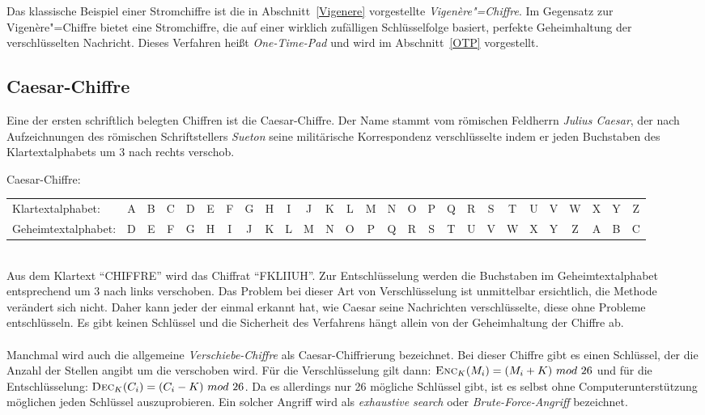 Das klassische Beispiel einer Stromchiffre ist die in Abschnitt~\ref{Vigenere} vorgestellte \emph{Vigen\`ere"=Chiffre}. Im Gegensatz zur Vigen\`ere"=Chiffre
bietet eine Stromchiffre, die auf einer wirklich zufälligen Schlüsselfolge basiert, perfekte Geheimhaltung der verschlüsselten Nachricht. Dieses Verfahren heißt \emph{One-Time-Pad} und wird im Abschnitt~\ref{OTP} vorgestellt.

\subsection{Caesar-Chiffre}
Eine der ersten schriftlich belegten Chiffren ist die Caesar-Chiffre. Der Name stammt vom römischen Feldherrn \emph{Julius Caesar}, der nach Aufzeichnungen des
römischen Schriftstellers \emph{Sueton} seine militärische Korrespondenz verschlüsselte indem er jeden Buchstaben des Klartextalphabets um 3 nach rechts
verschob.\\
\begin{beispiel} Caesar-Chiffre:
\vspace{0.2cm}

\setlength{\tabcolsep}{2pt}
\begin{tabular}{l*{26}{c}}
Klartextalphabet: &A&B&C&D&E&F&G&H&I&J&K&L&M&N&O&P&Q&R&S&T&U&V&W&X&Y&Z\\
Geheimtextalphabet: &D&E&F&G&H&I&J&K&L&M&N&O&P&Q&R&S&T&U&V&W&X&Y&Z&A&B&C\\
\end{tabular}
\end{beispiel} \ \\
Aus dem Klartext "`CHIFFRE"' wird das Chiffrat "`FKLIIUH"'. Zur Entschlüsselung werden die Buchstaben im Geheimtextalphabet entsprechend um 3 nach links
verschoben. Das Problem bei dieser Art von Verschlüsselung ist unmittelbar ersichtlich, die Methode verändert sich nicht. Daher kann jeder der einmal erkannt
hat, wie Caesar seine Nachrichten verschlüsselte, diese ohne Probleme entschlüsseln. Es gibt keinen Schlüssel und die Sicherheit des Verfahrens hängt allein von
der Geheimhaltung der Chiffre ab.\\ \ \\
Manchmal wird auch die allgemeine \emph{Verschiebe-Chiffre} als Caesar-Chiffrierung bezeichnet. Bei dieser Chiffre gibt es einen Schlüssel, der die Anzahl der
Stellen angibt um die verschoben wird. Für die Verschlüsselung gilt dann: $\enc_\key(\plaint_i) = (\plaint_i + \key)\ mod\ 26$ und für die Entschlüsselung:
$\dec_\key(\ciphert_i) = (\ciphert_i - \key)\ mod\ 26$. Da es allerdings nur 26 mögliche Schlüssel gibt, ist es selbst ohne Computerunterstützung möglichen
jeden Schlüssel auszuprobieren. Ein solcher Angriff wird als \emph{exhaustive search} oder \emph{Brute-Force-Angriff} bezeichnet.

